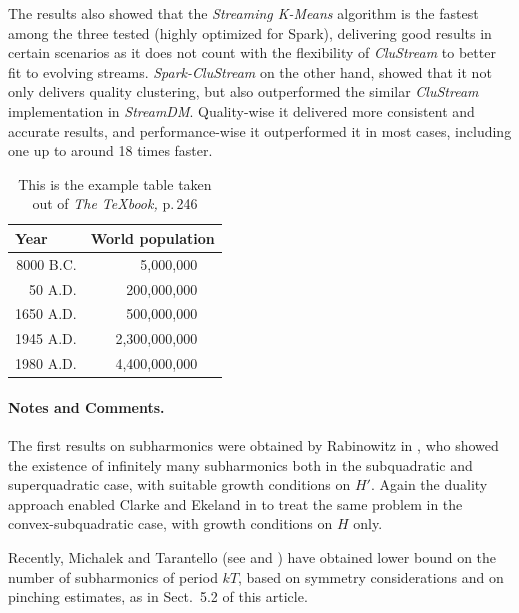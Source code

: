 \documentclass{llncs}
\begin{document}
The results also showed that the \textit{Streaming K-Means} algorithm is the fastest among the three tested (highly optimized for Spark), delivering good results in certain scenarios as it does not count with the flexibility of \textit{CluStream} to better fit to evolving streams. \textit{Spark-CluStream} on the other hand, showed that it not only delivers quality clustering, but also outperformed the similar \textit{CluStream} implementation in \textit{StreamDM}. Quality-wise it delivered more consistent and accurate results, and performance-wise it outperformed it in most cases, including one up to around 18 times faster. 



\begin{table}
\caption{This is the example table taken out of {\it The
\TeX{}book,} p.\,246}
\begin{center}
\begin{tabular}{r@{\quad}rl}
\hline
\multicolumn{1}{l}{\rule{0pt}{12pt}
                   Year}&\multicolumn{2}{l}{World population}\\[2pt]
\hline\rule{0pt}{12pt}
8000 B.C.  &     5,000,000& \\
  50 A.D.  &   200,000,000& \\
1650 A.D.  &   500,000,000& \\
1945 A.D.  & 2,300,000,000& \\
1980 A.D.  & 4,400,000,000& \\[2pt]
\hline
\end{tabular}
\end{center}
\end{table}


\paragraph{Notes and Comments.}
The first results on subharmonics were
obtained by Rabinowitz in \cite{rab}, who showed the existence of
infinitely many subharmonics both in the subquadratic and superquadratic
case, with suitable growth conditions on $H'$. Again the duality
approach enabled Clarke and Ekeland in \cite{clar:eke:2} to treat the
same problem in the convex-subquadratic case, with growth conditions on
$H$ only.

Recently, Michalek and Tarantello (see \cite{mich:tar} and \cite{tar})
have obtained lower bound on the number of subharmonics of period $kT$,
based on symmetry considerations and on pinching estimates, as in
Sect.~5.2 of this article.
\end{document}
